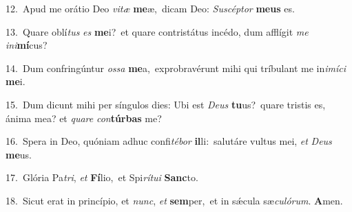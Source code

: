 {\numbfont\textcolor{\numbcolor}{12.}}~Apud me orátio Deo \textit{vi}\-\textit{tæ} \textbf{me}\-æ,~\star dicam Deo: \textit{Su}\-\textit{scép}\textit{tor} \textbf{me}\-\textbf{us} es.\par
{\numbfont\textcolor{\numbcolor}{13.}}~Quare oblí\textit{tus} \textit{es} \textbf{me}\-i?~\star et quare contristátus incédo, dum afflígit \textit{me} \textit{in}\-\textit{i}\textbf{mí}cus?\par
{\numbfont\textcolor{\numbcolor}{14.}}~Dum confringúntur \textit{os}\-\textit{sa} \textbf{me}\-a,~\star exprobravérunt mihi qui tríbulant me in\-\textit{i}\-\textit{mí}\textit{ci} \textbf{me}\-i.\par
{\numbfont\textcolor{\numbcolor}{15.}}~Dum dicunt mihi per síngulos dies: Ubi est \textit{De}\-\textit{us} \textbf{tu}\-us?~\star quare tristis es, ánima mea? et \textit{qua}\-\textit{re} \textit{con}\-\textbf{túr}\textbf{bas} me?\par
{\numbfont\textcolor{\numbcolor}{16.}}~Spera in Deo, quóniam adhuc confi\-\textit{té}\-\textit{bor} \textbf{il}\-li:~\star salutáre vultus mei, \textit{et} \textit{De}\-\textit{us} \textbf{me}\-us.\par
{\numbfont\textcolor{\numbcolor}{17.}}~Glória Pa\-\textit{tri}\-, \textit{et} \textbf{Fí}\-lio,~\star et Spi\-\textit{rí}\-\textit{tu}\textit{i} \textbf{Sanc}\-to.\par
{\numbfont\textcolor{\numbcolor}{18.}}~Sicut erat in princípio, et \textit{nunc}\-, \textit{et} \textbf{sem}\-per,~\star et in sǽcula sæ\-\textit{cu}\-\textit{ló}\textit{rum}. \textbf{A}\-men.\par
